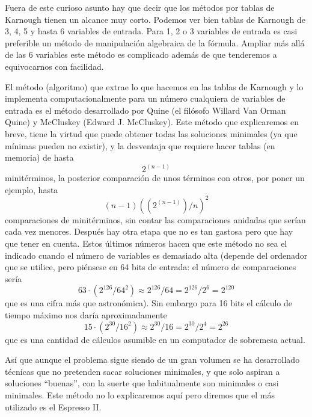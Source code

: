 \documentclass[
]{article}
\begin{document}
\begin{enumerate}
\begin{enumerate}
\begin{enumerate}
\begin{enumerate}
        Fuera de este curioso asunto hay que decir que los métodos por
        tablas de Karnough tienen un alcance muy corto. Podemos ver bien
        tablas de Karnough de 3, 4, 5 y hasta 6 variables de entrada.
        Para 1, 2 o 3 variables de entrada es casi preferible un método
        de manipulación algebraica de la fórmula. Ampliar más allá de
        las 6 variables este método es complicado además de que
        tenderemos a equivocarnos con facilidad.

        El método (algoritmo) que extrae lo que hacemos en las tablas de
        Karnough y lo implementa computacionalmente para un número
        cualquiera de variables de entrada es el método desarrollado por
        Quine (el filósofo Willard Van Orman Quine) y McCluskey (Edward
        J. McCluskey). Este método que explicaremos en breve, tiene la
        virtud que puede obtener todas las soluciones minimales (ya que
        mínimas pueden no existir), y la desventaja que requiere hacer
        tablas (en memoria) de hasta \[2^{({n - 1})}\] minitérminos, la
        posterior comparación de unos términos con otros, por poner un
        ejemplo, hasta
        \[{({n - 1})}{({{(2^{({n - 1})})}/n})}^{2}\]comparaciones de
        minitérminos, sin contar las comparaciones anidadas que serían
        cada vez menores. Después hay otra etapa que no es tan gastosa
        pero que hay que tener en cuenta. Estos últimos números hacen
        que este método no sea el indicado cuando el número de variables
        es demasiado alta (depende del ordenador que se utilice, pero
        piénsese en 64 bits de entrada: el número de comparaciones
        sería\[{{{63 \cdot {({2^{126}/64^{2}})}} \approx {2^{126}/64}} = {2^{126}/2^{6}}} = 2^{120}\]que
        es una cifra más que astronómica). Sin embargo para 16 bits el
        cálculo de tiempo máximo nos daría aproximadamente
        \[{{{15 \cdot {({2^{30}/16^{2}})}} \approx {2^{30}/16}} = {2^{30}/2^{4}}} = 2^{26}\]que
        es una cantidad de cálculos asumible en un computador de
        sobremesa actual.

        Así que aunque el problema sigue siendo de un gran volumen se ha
        desarrollado técnicas que no pretenden sacar soluciones
        minimales, y que solo aspiran a soluciones ``buenas'', con la
        suerte que habitualmente son minimales o casi minimales. Este
        método no lo explicaremos aquí pero diremos que el más utilizado
        es el Espresso II.


\end{enumerate}
\end{enumerate}
\end{enumerate}
\end{enumerate}
\end{document}

